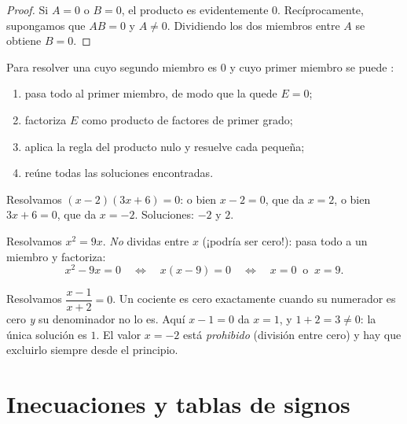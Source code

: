 \begin{proof}
Si $A = 0$ o $B = 0$, el producto es evidentemente $0$. Recíprocamente,
supongamos que $AB = 0$ y $A \neq 0$. Dividiendo los dos miembros entre
$A$ se obtiene $B = 0$.
\end{proof}

\begin{method}\label{met:g10:algebra:zeroproduct}
Para resolver una  cuyo segundo miembro es $0$ y cuyo primer
miembro se puede :
\begin{enumerate}
  \item pasa todo al primer miembro, de modo que la  quede
        $E = 0$;
  \item factoriza $E$ como producto de factores de primer grado;
  \item aplica la regla del producto nulo y resuelve cada 
        pequeña;
  \item reúne todas las soluciones encontradas.
\end{enumerate}
\end{method}

\begin{example}\label{ex:g10:algebra:zeroproduct}
Resolvamos $(x - 2)(3x + 6) = 0$: o bien $x - 2 = 0$, que da $x = 2$, o
bien $3x + 6 = 0$, que da $x = -2$. Soluciones: $-2$ y $2$.

Resolvamos $x^2 = 9x$. \emph{No} dividas entre $x$ (¡podría ser cero!):
pasa todo a un miembro y factoriza:
\[
x^2 - 9x = 0
\quad\Longleftrightarrow\quad
x(x - 9) = 0
\quad\Longleftrightarrow\quad
x = 0 \ \text{ o } \ x = 9 .
\]
\end{example}

\begin{example}\label{ex:g10:algebra:quotient}
Resolvamos $\dfrac{x - 1}{x + 2} = 0$. Un cociente es cero exactamente
cuando su numerador es cero \emph{y} su denominador no lo es. Aquí
$x - 1 = 0$ da $x = 1$, y $1 + 2 = 3 \neq 0$: la única solución es $1$. El
valor $x = -2$ está \emph{prohibido} (división entre cero) y hay que
excluirlo siempre desde el principio.
\end{example}

\section{Inecuaciones y tablas de signos}

